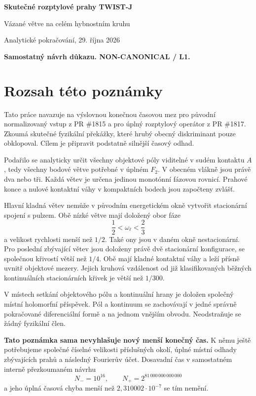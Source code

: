\documentclass[11pt,a4paper]{article}
\theoremstyle{remark}\newtheorem{remark}[theorem]{Poznámka}
\numberwithin{equation}{section}
\begin{document}
\thispagestyle{empty}
{\Large\sffamily\bfseries Skutečné rozptylové prahy TWIST-J\par}
\vspace{3mm}
{\large Vázané větve na celém hybnostním kruhu\par}
\vspace{4mm}
Analytické pokračování, 29. října 2026\par
\textbf{Samostatný návrh důkazu. NON-CANONICAL / L1.}

\section*{Rozsah této poznámky}

Tato práce navazuje na výslovnou konečnou časovou mez pro původní normalizovaný vstup z PR \#1815 a pro úplný rozptylový operátor z PR \#1817. Zkoumá skutečné fyzikální překážky, které hrubý obecný diskriminant pouze obklopoval. Cílem je připravit podstatně silnější časový odhad.

Podařilo se analyticky určit všechny objektové póly viditelné v sudém kontaktu \(A\), tedy všechny bodové větve potřebné v úplném \(F_2\). V obecném vlákně jsou právě dva nebo tři. Každá větev je určena jedinou monotónní fázovou rovnicí. Prahové konce a nulové kontaktní váhy v kompaktních bodech jsou započteny zvlášť.

Hlavní kladná větev nemůže v původním energetickém okně vytvořit stacionární spojení s pulzem. Obě nízké větve mají doložený obor fáze
\[
\frac12<\omega_\ell<\frac23
\]
a velikost rychlosti menší než \(1/2\). Také ony jsou v daném okně nestacionární. Pro poslední zbývající větev jsou doloženy právě dvě stacionární
konfigurace, se společnou křivostí větší než \(1/4\). Obě mají
kladné kontaktní váhy a leží přísně uvnitř objektové mezery.
Jejich kruhová vzdálenost od již klasifikovaných běžných
kontinuálních stacionárních křivek je větší než \(1/300\).

V místech setkání objektového pólu a kontinuální hrany je doložen společný místní holomorfní příspěvek. Pól a kontinuum se zachovávají v jedné správně pokračované diferenciální formě a na jednom vnějším obvodu. Neodstraňuje se žádný fyzikální člen.

\textbf{Tato poznámka sama nevyhlašuje nový menší konečný čas.} K němu ještě potřebujeme společné číselné velikosti příslušných okolí, úplné místní odhady zbývajících prahů a následný Fourierův účet. Dosavadní čas v samostatném interně přezkoumaném návrhu
\[
N_-=10^{16},\qquad N_+=2^{81\,000\,000\,000\,000}
\]
a jeho úplná časová chyba menší než \(2{,}310002\cdot10^{-7}\) se tím nemění.
\end{document}

